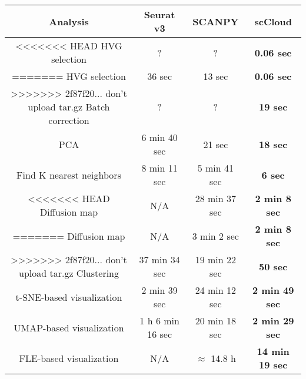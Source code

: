 \documentclass[10pt]{article}
\begin{document}
\begin{table}[H]
	\centering
	\begin{tabular}{|c|c|c|c|}
		\hline
		Analysis & Seurat v3 & SCANPY & scCloud\\
		\hline \hline
<<<<<<< HEAD
		HVG selection & ? & ? & \textbf{0.06 sec} \\
=======
		HVG selection & 36 sec & 13 sec & \textbf{0.06 sec} \\
>>>>>>> 2f87f20... don't upload tar.gz
		\hline
		Batch correction & ? & ? & \textbf{19 sec} \\
		\hline
		PCA & 6 min 40 sec & 21 sec & \textbf{18 sec} \\
		\hline
		Find K nearest neighbors & 8 min 11 sec &  5 min 41 sec & \textbf{6 sec}\\
		\hline
<<<<<<< HEAD
		Diffusion map & N/A & 28 min 37 sec & \textbf{2 min 8 sec} \\
=======
		Diffusion map & N/A & 3 min 2 sec & \textbf{2 min 8 sec} \\
>>>>>>> 2f87f20... don't upload tar.gz
		\hline 
		Clustering & 37 min 34 sec & 19 min 22 sec & \textbf{50 sec}\\
		\hline
		t-SNE-based visualization & 2 min 39 sec & 24 min 12 sec & \textbf{2 min 49 sec}\\
		\hline
		UMAP-based visualization & 1 h 6 min 16 sec & 20 min 18 sec & \textbf{2 min 29 sec}\\
		\hline
		FLE-based visualization & N/A & $\approx$ 14.8  h & \textbf{14 min 19 sec}\\
		\hline
	\end{tabular}
\end{table}
\end{document}
